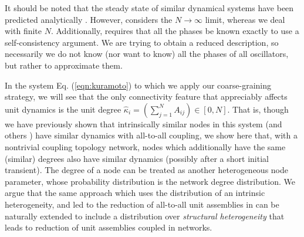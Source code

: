 \documentclass[numbers]{frontiersSCNS}
\newcommand{\degree}{\kappa}
\newcommand{\numNodes}{{N}}
\newcommand{\eqnRef}[1]{Eq. (\ref{eqn:#1})}
\begin{document}
It should be noted that the steady state of similar dynamical systems have been predicted analytically \cite{Ichinomiya2004,Restrepo2005}.
%
However, \cite{Ichinomiya2004} considers the $N\rightarrow\infty$ limit, whereas we deal with finite $N$.
%
Additionally, \cite{Restrepo2005} requires that all the phases be known exactly
to use a self-consistency argument.
%
We are trying to obtain a reduced description,
so necessarily we do not know (nor want to know) all the phases of all oscillators,
but rather to approximate them.





In the system \eqnRef{kuramoto} to which we apply our coarse-graining strategy,
we will see that
the only connectivity feature that appreciably affects unit dynamics is
the unit degree
$\hat\degree_i=
\left(
    \sum_{j=1}^\numNodes A_{ij}
\right)
\in[0, N]$.
%
That is, though we have previously shown 
that intrinsically similar nodes in this system \cite{Moon2006}
(and others \cite{Moon2014})
have similar dynamics with all-to-all coupling,
we show here that,
with a nontrivial coupling topology network,
nodes which additionally have the same (similar) degrees
also have similar dynamics (possibly after a short initial transient).
%
The degree of a node can be treated
as another heterogeneous node parameter,
whose probability distribution is the network degree distribution.
%
We argue that the same approach which uses the distribution of an intrinsic heterogeneity,
and led to the reduction of all-to-all unit assemblies in \cite{Moon2006}
can be naturally extended to include a distribution over {\em structural heterogeneity}
that leads to reduction of unit assemblies coupled in networks.
\end{document}
